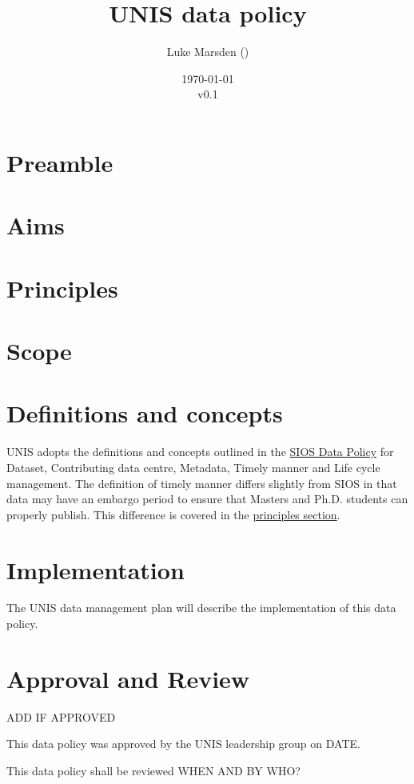\documentclass[a4paper,english, 11pt]{article}
\title{UNIS data policy}
\date{\today\\v0.1}
\author{Luke Marsden (\emailme)}
\begin{document}
\maketitle
\tableofcontents

\newpage

\section{Preamble}
\label{s:preamble}

\section{Aims}
\label{s:aims}

\section{Principles}
\label{s:principles}

\section{Scope}
\label{s:scope}

\section{Definitions and concepts}
\label{s:def}

UNIS adopts the definitions and concepts outlined in the \href{https://sios-svalbard.org/sites/sios-svalbard.org/files/common/SIOS_Data_Policy.pdf}{SIOS Data Policy} for Dataset, Contributing data centre, Metadata, Timely manner and Life cycle management. The definition of timely manner differs slightly from SIOS in that data may have an embargo period to ensure that Masters and Ph.D. students can properly publish. This difference is covered in the \hyperref[s:principles]{principles section}.

\section{Implementation}
\label{s:implementation}

The UNIS data management plan will describe the implementation of this data policy.

\section{Approval and Review}
\label{s:approval}

ADD IF APPROVED

This data policy was approved by the UNIS leadership group on DATE. 

This data policy shall be reviewed WHEN AND BY WHO?
\end{document}
